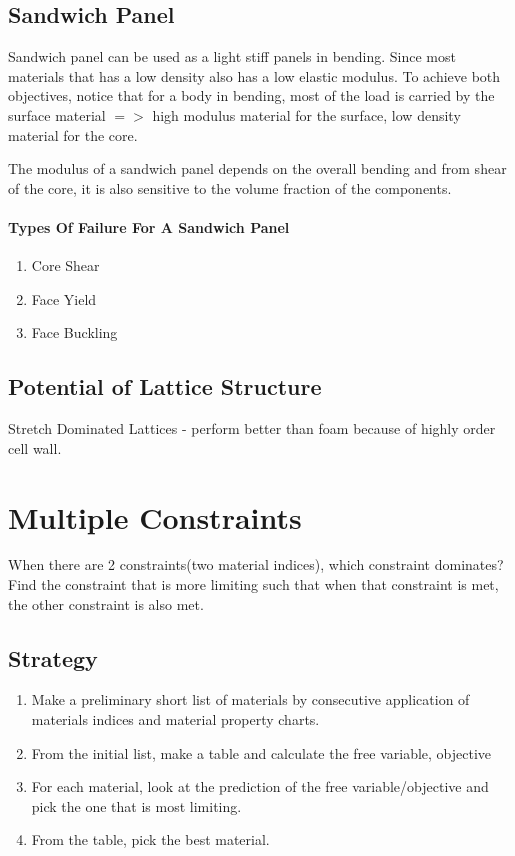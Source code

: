 \documentclass{article}
\begin{document}
    \subsection*{Sandwich Panel}
    Sandwich panel can be used as a light stiff panels in bending. Since most materials that
    has a low density also has a low elastic modulus. To achieve both objectives, notice that
    for a body in bending, most of the load is carried by the surface material $=>$ high modulus material for the surface, low
    density material for the core.
    \vspace{1em}

    \noindent The modulus of a sandwich panel depends on the overall bending and from shear of the core, it is also 
    sensitive to the volume fraction of the components.

    \paragraph*{Types Of Failure For A Sandwich Panel}
    \begin{enumerate}
        \item Core Shear
        \item Face Yield
        \item Face Buckling
    \end{enumerate}

    \subsection*{Potential of Lattice Structure}
    Stretch Dominated Lattices  - perform better than foam because of highly order cell wall. 

    \section*{Multiple Constraints}
    When there are 2 constraints(two material indices), which constraint dominates?
    Find the constraint that is more limiting such that when that constraint is met, the 
    other constraint is also met.
    
    \subsection*{Strategy}

        \begin{enumerate}
            \item Make a preliminary short list of materials by consecutive application of materials indices 
                  and material property charts.
            \item From the initial list, make a table and calculate the free variable, objective
            \item For each material, look at the prediction of the free variable/objective and pick the one 
                  that is most limiting.
            \item From the table, pick the best material.
        \end{enumerate}
\end{document}
